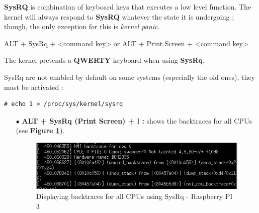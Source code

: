 \begin{itemize}
\textbf{SysRQ} is combination of keyboard keys that executes a low level function. The kernel will always respond to \textbf{SysRQ}
whatever the state it is undergoing ; though, the only exception for this is \emph{kernel panic}.
\begin{center}
ALT + SysRq + <command key>
or
ALT + Print Screen + <command key>
\end{center}

\vspace{5px}
\begin{center}
\begin{mdframed}[
        linecolor=red,linewidth=2pt,%
        frametitlerule=true,%
        apptotikzsetting={\tikzset{mdfframetitlebackground/.append style={%
            shade,left color=white, right color=blue!20}}}, 
        frametitlerulecolor=blue,
        frametitlerulewidth=1pt, innertopmargin=\topskip,
        frametitle={SysRq involves QWERTY Keyboard},
        outerlinewidth=1.25pt
    ]
		The kernel pretends a \textbf{QWERTY} keyboard when using \textbf{SysRq}.
\end{mdframed}
\end{center}


\vspace{10px}

SysRq are not enabled by default on some systems (especially the old ones), they must be activated :

	\begin{lstlisting}[style=BashInputStyle]
# echo 1 > /proc/sys/kernel/sysrq
	\end{lstlisting}
	
	\begin{itemize}
		\item[$\bullet$] \textbf{ALT + SysRq (Print Screen) + l :} shows the backtraces for all CPUs (see \textbf{Figure \ref{Displaying backtraces for all CPUs using SysRq - Raspberry PI 3}}).
		
    \begin{figure}[H]
			\centering
        	\includegraphics[scale=0.65]{img/solution/alt-sysrq-l.png}
        	\caption{Displaying backtraces for all CPUs using SysRq - Raspberry PI 3}
        	\label{Displaying backtraces for all CPUs using SysRq - Raspberry PI 3}
    \end{figure}		
		

\end{itemize}
\end{itemize}
